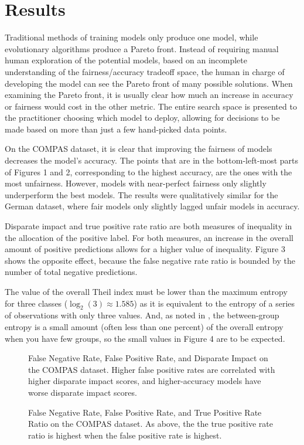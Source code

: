 \documentclass[10pt]{acmart}
\newcommand{\figures}[4]{
	\begin{figure}{
		\centering{
			\texttt{[image: \#1]}
		}
		\caption{#2}
		}
	\end{figure}
	\begin{figure} {
		\centering{
			\texttt{[image: \#3]}
		}
		\caption{#4}
	}
	\end{figure}
}
\begin{document}
\section{Results}
Traditional methods of training models only produce one model, while evolutionary algorithms produce a Pareto front.  Instead of requiring manual human exploration of the potential models, based on an incomplete understanding of the fairness/accuracy tradeoff space, the human in charge of developing the model can see the Pareto front of many possible solutions. When examining the Pareto front, it is usually clear how much an increase in accuracy or fairness would cost in the other metric. The entire search space is presented to the practitioner choosing which model to deploy, allowing for decisions to be made based on more than just a few hand-picked data points.

On the COMPAS dataset, it is clear that improving the fairness of models decreases the model’s accuracy. The points that are in the bottom-left-most parts of Figures 1 and 2, corresponding to the highest accuracy, are the ones with the most unfairness. However, models with near-perfect fairness only slightly underperform the best models. The results were qualitatively similar for the German dataset, where fair models only slightly lagged unfair models in accuracy.

Disparate impact and true positive rate ratio are both measures of inequality in the allocation of the positive label. For both measures, an increase in the overall amount of positive predictions allows for a higher value of inequality. Figure 3 shows the opposite effect, because the false negative rate ratio is bounded by the number of total negative predictions.

The value of the overall Theil index must be lower than the maximum entropy for three classes ($\log_2(3) \approx 1.585$) as it is equivalent to the entropy of a series of observations with only three values. And, as noted in \citep{Speicher:2018}, the between-group entropy is a small amount (often less than one percent) of the overall entropy when you have few groups, so the small values in Figure 4 are to be expected.

\figures{Disparate Impact|COMPAS.png}{False Negative Rate, False Positive Rate, and Disparate Impact on the COMPAS dataset. Higher false positive rates are correlated with higher disparate impact scores, and higher-accuracy models have worse disparate impact scores.}{TPR Ratio|COMPAS.png}{False Negative Rate, False Positive Rate, and True Positive Rate Ratio on the COMPAS dataset. As above, the the true positive rate ratio is highest when the false positive rate is highest.}
\end{document}
